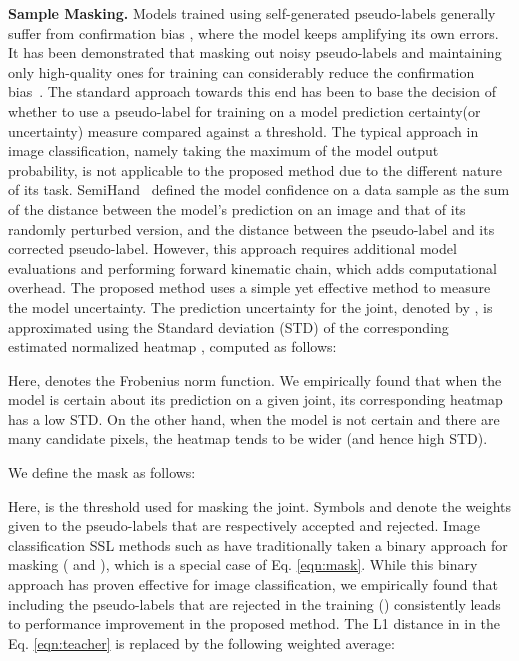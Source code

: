 \documentclass{article}
\begin{document}
\par
\textbf{Sample Masking.} Models trained using self-generated pseudo-labels generally suffer from confirmation bias \cite{tarvainen2017mean}, where the model keeps amplifying its own errors. It has been demonstrated that masking out noisy pseudo-labels and maintaining only high-quality ones for training can considerably reduce the confirmation bias~\cite{arazo2020pseudo}. The standard approach towards this end has been to base the decision of whether to use a pseudo-label for training on a model prediction certainty(or uncertainty) measure compared against a threshold. The typical approach in image classification, namely taking the maximum of the model output probability, is not applicable to the proposed method due to the different nature of its task. SemiHand~\cite{yang2021semihand} defined the model confidence on a data sample as the sum of the distance between the model's prediction on an image and that of its randomly perturbed version, and the distance between the pseudo-label and its corrected pseudo-label. However, this approach requires additional model evaluations and performing forward kinematic chain, which adds computational overhead. The proposed method uses a simple yet effective method to measure the model uncertainty. The prediction uncertainty for the  joint, denoted by , is approximated using the Standard deviation (STD) of the corresponding estimated normalized heatmap , computed as follows:

Here,  denotes the Frobenius norm function. We empirically found that when the model is certain about its prediction on a given joint, its corresponding heatmap has a low STD. On the other hand, when the model is not certain and there are many candidate pixels, the heatmap tends to be wider (and hence high STD).
\par
We define the mask  as follows:



Here,  is the threshold used for masking the  joint. Symbols  and  denote the weights given to the pseudo-labels that are respectively accepted and rejected. Image classification SSL methods such as  \cite{sohn2020fixmatch,xie2019unsupervised,zhang2021flexmatch} have traditionally taken a binary approach for masking ( and ), which is a special case of Eq. \ref{eqn:mask}. While this binary approach has proven effective for image classification, we empirically found that including 
the pseudo-labels that are rejected in the training () consistently leads to performance improvement in the proposed method. The L1 distance  in  in the Eq. \ref{eqn:teacher} is replaced by the following weighted average:
\end{document}
